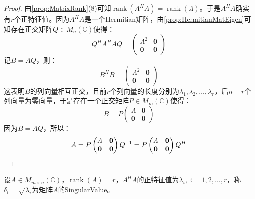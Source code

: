 \begin{proof}
	由\cref{prop:MatrixRank}(8)可知$\operatorname{rank}(A^HA)=\operatorname{rank}(A)$。于是$A^HA$确实有$r$个正特征值。因为$A^HA$是一个Hermitian矩阵，由\cref{prop:HermitianMatEigen}可知存在正交矩阵$Q\in M_{n}(\mathbb{C})$使得：
	\begin{equation*}
		Q^HA^HAQ=
		\begin{pmatrix}
			\varLambda^2 & \mathbf{0} \\
			\mathbf{0} & \mathbf{0}
		\end{pmatrix}
	\end{equation*}
	记$B=AQ$，则：
	\begin{equation*}
		B^HB=
		\begin{pmatrix}
			\varLambda^2 & \mathbf{0} \\
			\mathbf{0} & \mathbf{0}
		\end{pmatrix}
	\end{equation*}
	这表明$B$的列向量相互正交，且前$r$个列向量的长度分别为$\lambda_1,\lambda_2,\dots,\lambda_r$，后$n-r$个列向量为零向量，于是存在一个正交矩阵$P\in M_{m}(\mathbb{C})$使得：
	\begin{equation*}
		B=P
		\begin{pmatrix}
			\varLambda & \mathbf{0} \\
			\mathbf{0} & \mathbf{0}
		\end{pmatrix}
	\end{equation*}
	因为$B=AQ$，所以：
	\begin{equation*}
		A=P
		\begin{pmatrix}
			\varLambda & \mathbf{0} \\
			\mathbf{0} & \mathbf{0}
		\end{pmatrix}Q^{-1}
		=P
		\begin{pmatrix}
			\varLambda & \mathbf{0} \\
			\mathbf{0} & \mathbf{0}
		\end{pmatrix}Q^H\qedhere
	\end{equation*}
\end{proof}
\begin{definition}
	设$A\in M_{m\times n}(\mathbb{C})$，$\operatorname{rank}(A)=r$，$A^HA$的正特征值为$\lambda_i,\;i=1,2,\dots,r$，称$\delta_i=\sqrt{\lambda_i}$为矩阵$A$的\gls{SingularValue}。
\end{definition}